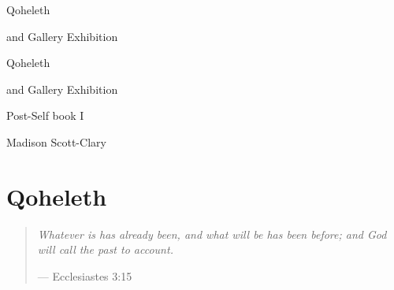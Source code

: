\documentclass[11pt]{memoir}
\begin{document}
  \frontmatter

  \thispagestyle{empty}
  \null
  \vfill
  \begin{flushright}
    \DisplayFont Qoheleth

    \vspace{1ex}

    {\footnotesize and Gallery Exhibition}
  \end{flushright}
  \vfill
  \cleardoublepage

  \pagestyle{plain}

  \doublespacing

  \begin{flushright}
    \null
    \vfill
    {\Huge\DisplayFont Qoheleth}

    \vspace{1ex}

    {\Large\DisplayFont and Gallery Exhibition}

    {\DisplayFont Post-Self book I}

    \vfill

    {\Large\DisplayFont Madison Scott-Clary}
  \end{flushright}
  \thispagestyle{empty}

  \newpage

  

  \tableofcontents*
  \newpage
  \null
  \cleardoublepage

  \onehalfspacing


  \mainmatter

  \pagestyle{ourbook}

  \cleardoublepage
  \part*{Qoheleth}
  \null
  \thispagestyle{empty}
  \vfill
  \begin{quote}
    \emph{Whatever is has already been, and what will be has been \mbox{before;} and God will call the past to account.}

    --- Ecclesiastes 3:15
  \end{quote}
  \vfill
  
  
  
  

%  
%
%  
\end{document}
